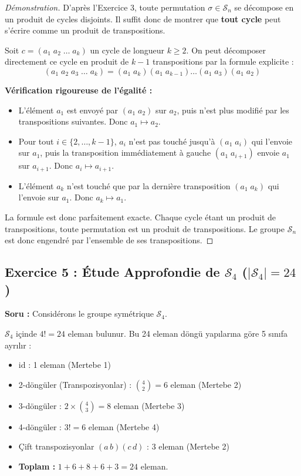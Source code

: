 \documentclass[12pt,a4paper]{report}
\begin{document}
\begin{proof}[Démonstration]
D'après l'Exercice 3, toute permutation $\sigma \in \mathcal{S}_n$ se décompose en un produit de cycles disjoints. Il suffit donc de montrer que \textbf{tout cycle} peut s'écrire comme un produit de transpositions.

Soit $c = (a_1 \; a_2 \; \dots \; a_k)$ un cycle de longueur $k \geq 2$.  
On peut décomposer directement ce cycle en produit de $k - 1$ transpositions par la formule explicite :
\[ (a_1 \; a_2 \; a_3 \; \dots \; a_k) = (a_1 \; a_k)(a_1 \; a_{k-1}) \dots (a_1 \; a_3)(a_1 \; a_2) \]

\textbf{Vérification rigoureuse de l'égalité :}
\begin{itemize}
    \item L'élément $a_1$ est envoyé par $(a_1 \; a_2)$ sur $a_2$, puis n'est plus modifié par les transpositions suivantes. Donc $a_1 \mapsto a_2$.
    \item Pour tout $i \in \{2, \dots, k-1\}$, $a_i$ n'est pas touché jusqu'à $(a_1 \; a_i)$ qui l'envoie sur $a_1$, puis la transposition immédiatement à gauche $(a_1 \; a_{i+1})$ envoie $a_1$ sur $a_{i+1}$. Donc $a_i \mapsto a_{i+1}$.
    \item L'élément $a_k$ n'est touché que par la dernière transposition $(a_1 \; a_k)$ qui l'envoie sur $a_1$. Donc $a_k \mapsto a_1$.
\end{itemize}
La formule est donc parfaitement exacte.  
Chaque cycle étant un produit de transpositions, toute permutation est un produit de transpositions.  
Le groupe $\mathcal{S}_n$ est donc engendré par l'ensemble de ses transpositions.
\end{proof}

\vspace{0.5cm}

\subsection*{Exercice 5 : Étude Approfondie de $\mathcal{S}_4$ ($|\mathcal{S}_4| = 24$)}
\textbf{Soru :} Considérons le groupe symétrique $\mathcal{S}_4$.

\begin{tcolorbox}[colback=teal!5!white,colframe=teal!80!black,title=$\mathcal{S}_4$'ün 24 Elemanının Tip Dağılımı ve Mertebeleri]
$\mathcal{S}_4$ içinde $4! = 24$ eleman bulunur. Bu 24 eleman döngü yapılarına göre 5 sınıfa ayrılır :
\begin{itemize}
    \item $\mathrm{id}$ : 1 eleman (Mertebe 1)
    \item 2-döngüler (Transpozisyonlar) : $\binom{4}{2} = 6$ eleman (Mertebe 2)
    \item 3-döngüler : $2 \times \binom{4}{3} = 8$ eleman (Mertebe 3)
    \item 4-döngüler : $3! = 6$ eleman (Mertebe 4)
    \item Çift transpozisyonlar $(a\,b)(c\,d)$ : 3 eleman (Mertebe 2)
    \item \textbf{Toplam :} $1 + 6 + 8 + 6 + 3 = 24$ eleman.
\end{itemize}
\end{tcolorbox}
\end{document}
